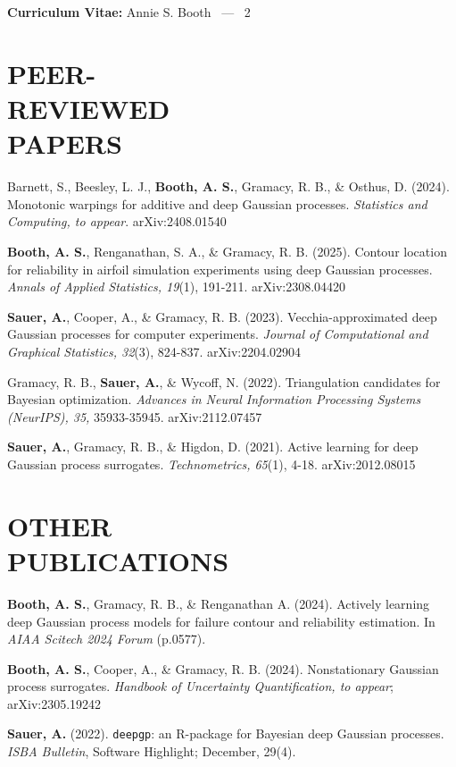 \documentclass[margin,line,11pt]{res}
\begin{document}
\begin{resume}
\pagebreak
\section{}
\hfill {\bf Curriculum Vitae:} Annie S. Booth \  --- \  2
\medskip

\section{\bf{PEER- \\ REVIEWED \\ PAPERS}}

Barnett, S., Beesley, L. J., {\bf Booth, A. S.}, Gramacy, R. B., \& Osthus, D. (2024). Monotonic 
warpings for additive and deep Gaussian processes. {\it Statistics and Computing, to appear}. arXiv:2408.01540

{\bf Booth, A. S.}, Renganathan, S. A., \& Gramacy, R. B. (2025). Contour location
for reliability in airfoil simulation experiments using deep Gaussian
processes.  {\it Annals of Applied Statistics, 19}(1), 191-211. arXiv:2308.04420

{\bf Sauer, A.}, Cooper, A., \& Gramacy, R. B. (2023). Vecchia-approximated
deep Gaussian processes for computer experiments. {\it Journal of Computational
and Graphical Statistics, 32}(3), 824-837. arXiv:2204.02904

Gramacy, R. B., {\bf Sauer, A.}, \& Wycoff, N. (2022). Triangulation 
candidates for Bayesian optimization. {\it Advances in Neural Information
Processing Systems (NeurIPS), 35,} 35933-35945. arXiv:2112.07457

{\bf Sauer, A.}, Gramacy, R. B., \& Higdon, D. (2021). Active learning 
for deep Gaussian process surrogates. {\it Technometrics, 65}(1), 4-18. 
arXiv:2012.08015

\section{OTHER \\ PUBLICATIONS}

{\bf Booth, A. S.}, Gramacy, R. B., \& Renganathan A. (2024). Actively learning deep Gaussian
process models for failure contour and reliability estimation.  In {\it AIAA Scitech 2024 Forum} (p.0577).

{\bf Booth, A. S.}, Cooper, A., \& Gramacy, R. B. (2024). Nonstationary
Gaussian process surrogates. {\it Handbook of Uncertainty Quantification, to appear}; arXiv:2305.19242

{\bf Sauer, A.} (2022). {\tt deepgp}: an {\sf R}-package for Bayesian deep Gaussian 
processes.  {\it ISBA Bulletin}, Software Highlight; December, 29(4).


\end{resume}
\end{document}
